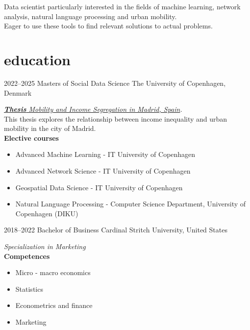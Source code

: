 \documentclass[]{friggeri-cv-a4}
\begin{document}
Data scientist particularly interested in the fields of machine learning, network analysis, natural language processing and urban mobility. \\
Eager to use these tools to find relevant solutions to actual problems.



\section{education}

\begin{entrylist}


\entry
{2022--2025}
{Masters {\normalfont of Social Data Science}}
{The University of Copenhagen, Denmark}
{\emph{\href{https://github.com/carobs9/segregation-madrid}{\textbf{Thesis} Mobility and Income Segregation in Madrid, Spain}.} \\ 
This thesis explores the relationship between income inequality and urban mobility in the city of Madrid. \\
\textbf{Elective courses}
\begin{itemize}
    \item Advanced Machine Learning - IT University of Copenhagen
    \item Advanced Network Science - IT University of Copenhagen
    \item Geospatial Data Science - IT University of Copenhagen
    \item Natural Language Processing - Computer Science Department, University of Copenhagen (DIKU)
\end{itemize}}

\entry
{2018--2022}
{Bachelor {\normalfont of Business}}
{Cardinal Stritch University, United States}
{\emph{Specialization in Marketing} \\
\textbf{Competences}
\begin{itemize}
    \item Micro - macro economics
    \item Statistics
    \item Econometrics and finance
    \item Marketing
\end{itemize}}


\end{entrylist}
\end{document}
